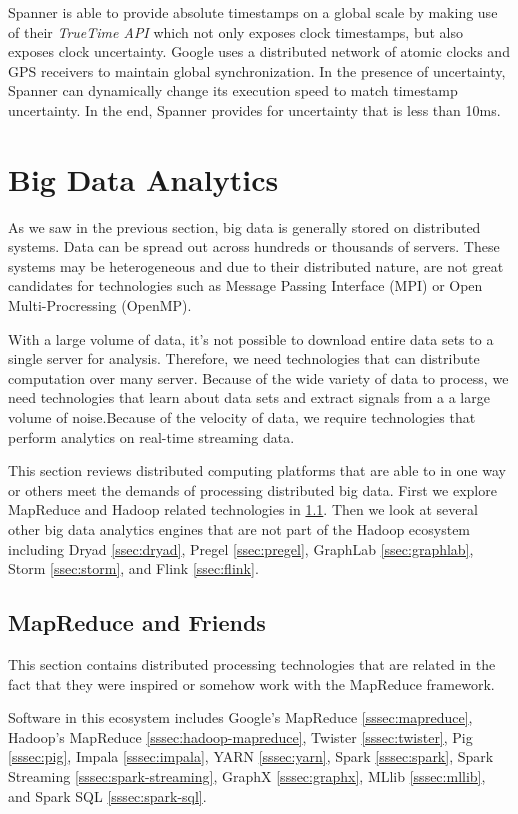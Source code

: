 \documentclass[]{article}
\begin{document}
Spanner is able to provide absolute timestamps on a global scale by making use of their \textit{TrueTime API} which not only exposes clock timestamps, but also exposes clock uncertainty. Google uses a distributed network of atomic clocks and GPS receivers to maintain global synchronization. In the presence of uncertainty, Spanner can dynamically change its execution speed to match timestamp uncertainty. In the end, Spanner provides for uncertainty that is less than 10ms.


\section{Big Data Analytics} \label{sec:big-data-analytics}
As we saw in the previous section, big data is generally stored on distributed systems. Data can be spread out across hundreds or thousands of servers. These systems may be heterogeneous and due to their distributed nature, are not great candidates for technologies such as Message Passing Interface (MPI) or Open Multi-Procressing (OpenMP)\cite{chen_big_2014}. 

With a large volume of data, it's not possible to download  entire data sets to a single server for analysis. Therefore, we need technologies that can distribute computation over many server. Because of the wide variety of data to process, we need technologies that learn about data sets and extract signals from a a large volume of noise.Because of the velocity of data, we require technologies that perform analytics on real-time streaming data.

This section reviews distributed computing platforms that are able to in one way or others meet the demands of processing distributed big data. First we explore MapReduce and Hadoop related technologies in \ref{ssec:mapreduce-and-friends}. Then we look at several other big data analytics engines that are not part of the Hadoop ecosystem including Dryad \ref{ssec:dryad}, Pregel \ref{ssec:pregel}, GraphLab \ref{ssec:graphlab}, Storm \ref{ssec:storm}, and Flink \ref{ssec:flink}.

\subsection{MapReduce and Friends}\label{ssec:mapreduce-and-friends}
This section contains distributed processing technologies that are related in the fact that they were inspired or somehow work with the MapReduce framework.

Software in this ecosystem includes Google's MapReduce \ref{sssec:mapreduce}, Hadoop's MapReduce \ref{sssec:hadoop-mapreduce}, Twister \ref{sssec:twister}, Pig \ref{sssec:pig}, Impala \ref{sssec:impala}, YARN \ref{sssec:yarn}, Spark \ref{sssec:spark}, Spark Streaming \ref{sssec:spark-streaming}, GraphX \ref{sssec:graphx}, MLlib \ref{sssec:mllib}, and Spark SQL \ref{sssec:spark-sql}.
\end{document}
